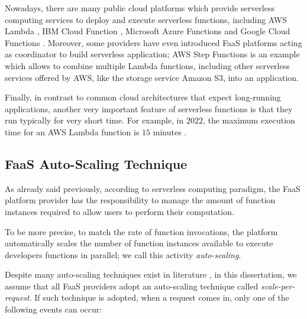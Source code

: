 \documentclass[12pt,a4paper]{report}
\begin{document}
Nowadays, there are many public cloud platforms which provide serverless computing services to deploy and execute serverless functions, including AWS Lambda \cite{AWSLambda}, IBM Cloud Function \cite{IBMCloudFunctions}, Microsoft Azure Functions \cite{AzureFunctions} and Google Cloud Functions \cite{GoogleCloud}. Moreover, some providers have even introduced FaaS platforms acting as coordinator to build serverless application; AWS Step Functions is an example which allows to combine multiple Lambda functions, including other serverless services offered by AWS, like the storage service Amazon S3, into an application. 

Finally, in contrast to common cloud architectures that expect long-running applications, another very important feature of serverless functions is that they run typically for very short time. For example, in $2022$, the maximum execution time for an AWS Lambda function is $15$ minutes \cite{AWSTimeout}. 

\subsection{FaaS Auto-Scaling Technique}

As already said previously, according to serverless computing paradigm, the FaaS platform provider has the responsibility to manage the amount of function instances required to allow users to perform their computation.

To be more precise, to match the rate of function invocations, the platform automatically scales the number of function instances available to execute developers functions in parallel; we call this activity \textit{auto-scaling}.

Despite many auto-scaling techniques exist in literature \cite{PMSCP}, in this dissertation, we assume that all FaaS providers adopt an auto-scaling technique called \textit{scale-per-request}. If such technique is adopted, when a request comes in, only one of the following events can occur:
\end{document}
